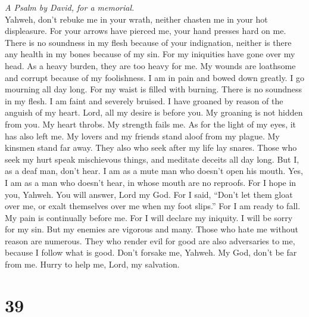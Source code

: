\emph{A Psalm by David, for a memorial.}\\
 Yahweh, don't rebuke me in your wrath, neither chasten me
in your hot displeasure.  For your arrows have pierced me,
your hand presses hard on me.  There is no soundness in my
flesh because of your indignation, neither is there any health in my
bones because of my sin.  For my iniquities have gone over
my head. As a heavy burden, they are too heavy for me.  My
wounds are loathsome and corrupt because of my foolishness.
 I am in pain and bowed down greatly. I go mourning all
day long.  For my waist is filled with burning. There is
no soundness in my flesh.  I am faint and severely
bruised. I have groaned by reason of the anguish of my heart.
 Lord, all my desire is before you. My groaning is not
hidden from you.  My heart throbs. My strength fails me.
As for the light of my eyes, it has also left me.  My
lovers and my friends stand aloof from my plague. My kinsmen stand far
away.  They also who seek after my life lay snares. Those
who seek my hurt speak mischievous things, and meditate deceits all day
long.  But I, as a deaf man, don't hear. I am as a mute
man who doesn't open his mouth.  Yes, I am as a man who
doesn't hear, in whose mouth are no reproofs.  For I hope
in you, Yahweh. You will answer, Lord my God.  For I
said, ``Don't let them gloat over me, or exalt themselves over me when
my foot slips.''  For I am ready to fall. My pain is
continually before me.  For I will declare my iniquity. I
will be sorry for my sin.  But my enemies are vigorous
and many. Those who hate me without reason are numerous. 
They who render evil for good are also adversaries to me, because I
follow what is good.  Don't forsake me, Yahweh. My God,
don't be far from me.  Hurry to help me, Lord, my
salvation.

\hypertarget{section-38}{%
\section{39}\label{section-38}}

